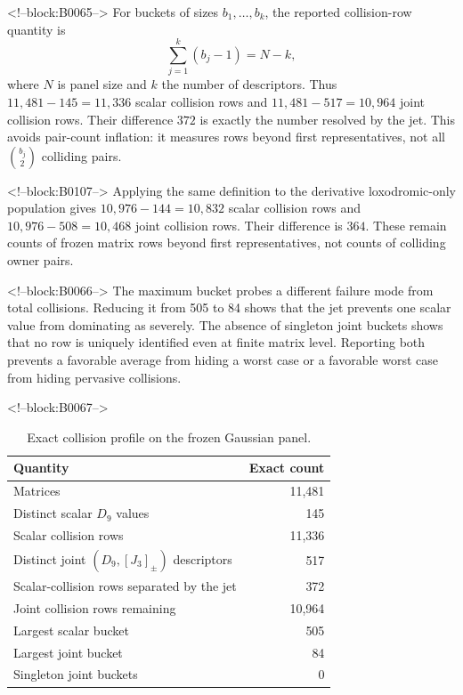 \documentclass[11pt,a4paper]{article}
\theoremstyle{definition}
\theoremstyle{remark}
\begin{document}
<!--block:B0065-->
For buckets of sizes \(b_1,\ldots,b_k\), the reported collision-row quantity is
\[
 \sum_{j=1}^k(b_j-1)=N-k,
\]
where \(N\) is panel size and \(k\) the number of descriptors. Thus \(11{,}481-145=11{,}336\) scalar collision rows and \(11{,}481-517=10{,}964\) joint collision rows. Their difference \(372\) is exactly the number resolved by the jet. This avoids pair-count inflation: it measures rows beyond first representatives, not all \(\binom{b_j}{2}\) colliding pairs.

<!--block:B0107-->
Applying the same definition to the derivative loxodromic-only population gives \(10{,}976-144=10{,}832\) scalar collision rows and \(10{,}976-508=10{,}468\) joint collision rows. Their difference is \(364\). These remain counts of frozen matrix rows beyond first representatives, not counts of colliding owner pairs.

<!--block:B0066-->
The maximum bucket probes a different failure mode from total collisions. Reducing it from 505 to 84 shows that the jet prevents one scalar value from dominating as severely. The absence of singleton joint buckets shows that no row is uniquely identified even at finite matrix level. Reporting both prevents a favorable average from hiding a worst case or a favorable worst case from hiding pervasive collisions.

<!--block:B0067-->
\begin{table}[t]
\centering
\caption{Exact collision profile on the frozen Gaussian panel.}
\label{tab:collision}
\begin{tabular}{lr}
\toprule
Quantity & Exact count \\
\midrule
Matrices & 11,481 \\
Distinct scalar \(D_9\) values & 145 \\
Scalar collision rows & 11,336 \\
Distinct joint \((D_9,[J_3]_{\pm})\) descriptors & 517 \\
Scalar-collision rows separated by the jet & 372 \\
Joint collision rows remaining & 10,964 \\
Largest scalar bucket & 505 \\
Largest joint bucket & 84 \\
Singleton joint buckets & 0 \\
\bottomrule
\end{tabular}
\end{table}
\end{document}
